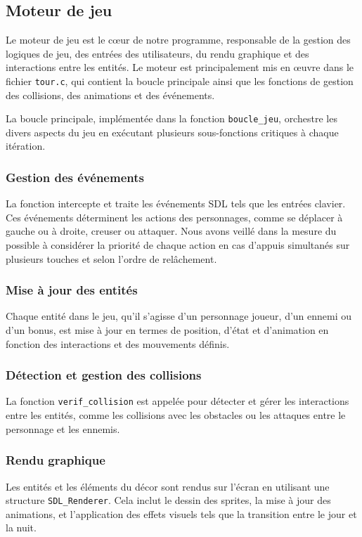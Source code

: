 \documentclass[a4paper,12pt]{article}
\begin{document}
\subsection{Moteur de jeu}
Le moteur de jeu est le cœur de notre programme, responsable de la gestion des logiques de jeu, des entrées des utilisateurs, du rendu graphique et des interactions entre les entités. Le moteur est principalement mis en œuvre dans le fichier \texttt{tour.c}, qui contient la boucle principale ainsi que les fonctions de gestion des collisions, des animations et des événements.

La boucle principale, implémentée dans la fonction \texttt{boucle\_jeu}, orchestre les divers aspects du jeu en exécutant plusieurs sous-fonctions critiques à chaque itération.

\subsubsection{Gestion des événements}
La fonction intercepte et traite les événements SDL tels que les entrées clavier. Ces événements déterminent les actions des personnages, comme se déplacer à gauche ou à droite, creuser ou attaquer. Nous avons veillé dans la mesure du possible à considérer la priorité de chaque action en cas d’appuis simultanés sur plusieurs touches et selon l’ordre de relâchement.
    
\subsubsection{Mise à jour des entités}
Chaque entité dans le jeu, qu'il s'agisse d'un personnage joueur, d'un ennemi ou d'un bonus, est mise à jour en termes de position, d'état et d'animation en fonction des interactions et des mouvements définis.
    
\subsubsection{Détection et gestion des collisions}
La fonction \texttt{verif\_collision} est appelée pour détecter et gérer les interactions entre les entités, comme les collisions avec les obstacles ou les attaques entre le personnage et les ennemis.
    
\subsubsection{Rendu graphique}
Les entités et les éléments du décor sont rendus sur l'écran en utilisant une structure \texttt{SDL\_Renderer}. Cela inclut le dessin des sprites, la mise à jour des animations, et l'application des effets visuels tels que la transition entre le jour et la nuit.
\end{document}
